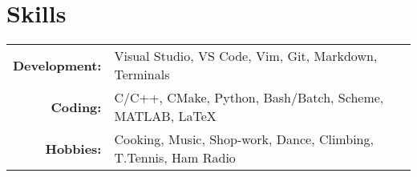 \section*{\color{Blue}Skills\vspace{0.5mm}{\color{Orange}\hrule}}

\begin{tabular}{ r | l }
\textbf{Development:}   &Visual Studio, VS Code, Vim, Git, Markdown, Terminals\\
\textbf{Coding:}        &C/C++, CMake, Python, Bash/Batch, Scheme, MATLAB, \LaTeX\\
\textbf{Hobbies:}       &Cooking, Music, Shop-work, Dance, Climbing, T.Tennis, Ham Radio
\end{tabular}